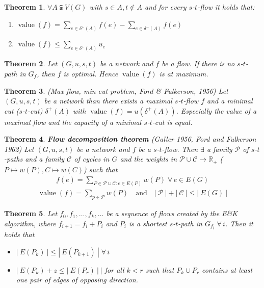 \documentclass{article}
\newtheorem{theorem}{Theorem}
\newcommand{\card}[1]{\left|\:\!#1\:\!\right|}
\newcommand{\gath}[2]{$#1$-$#2$-path} %
\newcommand{\flow}[2]{$#1$-$#2$-flow}
\newcommand{\fall}{\;\forall\,}
\begin{document}
\begin{theorem}
  \label{lemma-4.2}
  $\forall A \subsetneqq V(G)$ with $s \in A, t \notin A$ and for every $s$-$t$-flow it holds that:
  \begin{enumerate}
    \item $\operatorname{value}{(f)} = \sum_{e \in \delta^+(A)} f(e) - \sum_{e \in \delta^-(A)} f(e)$
    \item $\operatorname{value}{(f)} \leq \sum_{e \in \delta^+(A)} u_e$
  \end{enumerate}
\end{theorem}
\begin{theorem}\label{lemma-4.3}
  Let $(G, u, s, t)$ be a network and $f$ be a flow. If there is no \gath st in $G_f$,
  then $f$ is optimal. Hence $\operatorname{value}(f)$ is at maximum.
\end{theorem}
\begin{theorem} \label{satz-4.4}
  (\emph{Max flow, min cut problem}, Ford \& Fulkerson, 1956)
  Let $(G, u, s, t)$ be a network than there exists a maximal \flow st $f$
  and a minimal cut ($s$-$t$-cut) $\delta^+(A)$ with $\operatorname{value}(f) = u(\delta^+(A))$.
  Especially the value of a maximal flow and the capacity of a minimal $s$-$t$-cut is equal.
\end{theorem}
\begin{theorem}\label{satz-4.5}
  \textbf{Flow decomposition theorem} (Galler 1956, Ford and Fulkerson 1962)
  Let $(G, u, s, t)$ be a network and $f$ be a \flow st. Then $\exists$ a family
  $\mathcal{P}$ of \gath sts and a family $\mathcal{C}$ of cycles in $G$ and the
  weights in $\mathcal{P} \cup \mathcal{C} \rightarrow \mathbb{R}_+$
  ($P \mapsto w(P), C \mapsto w(C)$) such that
  \begin{align*}
    f(e) = \sum_{P \in \mathcal{P} \cup \mathcal{C}: e \in E(P)} w(P) \fall e \in E(G)
  \end{align*}
  \begin{align*}
    \operatorname{value}(f) = \sum_{p \in \mathcal{P}} w(P)
      \quad\text{and}\quad
      \card{\mathcal{P}} + \card{\mathcal{C}} \leq \card{E(G)}
  \end{align*}
\end{theorem}
\begin{theorem}\label{lemma-4.6}
  Let $f_0, f_1, \ldots, f_k, \ldots$ be a sequence of flows created by the E\&K algorithm, where $f_{i+1} = f_i + P_i$ and $P_i$ is a shortest \gath st in $G_{f_i} \fall i$. Then it holds that
  \begin{itemize}
    \item $\card{E(P_k)} \leq \card{E(P_{k+1})} \fall i$
    \item $\card{E(P_k) + z \leq \card{E(P_r)}}$ for all $k < r$ such that $P_k \cup P_r$ contains at least one pair of edges of opposing direction.
  \end{itemize}
\end{theorem}
\end{document}
